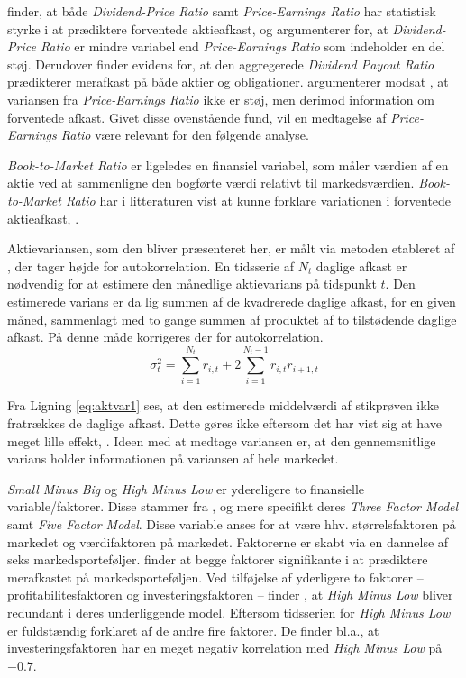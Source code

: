 \documentclass[
  a4paper,
  oneside]{memoir}
\begin{document}
\citep{Fama1988} finder, at både \emph{Dividend-Price Ratio} samt \emph{Price-Earnings Ratio} har statistisk styrke i at prædiktere forventede aktieafkast, og argumenterer for, at \emph{Dividend-Price Ratio} er mindre variabel end \emph{Price-Earnings Ratio} som indeholder en del støj. Derudover finder \citep{Lamont1998} evidens for, at den aggregerede \emph{Dividend Payout Ratio} prædikterer merafkast på både aktier og obligationer. \citep{Lamont1998} argumenterer modsat \citep{Fama1988}, at variansen fra \emph{Price-Earnings Ratio} ikke er støj, men derimod information om forventede afkast. Givet disse ovenstående fund, vil en medtagelse af \emph{Price-Earnings Ratio} være relevant for den følgende analyse.

\emph{Book-to-Market Ratio} er ligeledes en finansiel variabel, som måler værdien af en aktie ved at sammenligne den bogførte værdi relativt til markedsværdien. \emph{Book-to-Market Ratio} har i litteraturen vist at kunne forklare variationen i forventede aktieafkast, \citep{Kothari1997}.

Aktievariansen, som den bliver præsenteret her, er målt via metoden etableret af \citep{Schwert1987}, der tager højde for autokorrelation. En tidsserie af \(N_t\) daglige afkast er nødvendig for at estimere den månedlige aktievarians på tidspunkt \(t\). Den estimerede varians er da lig summen af de kvadrerede daglige afkast, for en given måned, sammenlagt med to gange summen af produktet af to tilstødende daglige afkast. På denne måde korrigeres der for autokorrelation.
\begin{equation}
\sigma^2_t = \sum_{i=1}^{N_t} r_{i,t} + 2 \sum_{i=1}^{N_t-1} r_{i,t}r_{i+1,t} \label{eq:aktvar1}
\end{equation}

Fra Ligning \eqref{eq:aktvar1} ses, at den estimerede middelværdi af stikprøven ikke fratrækkes de daglige afkast. Dette gøres ikke eftersom det har vist sig at have meget lille effekt, \citep{Schwert1987}. Ideen med at medtage variansen er, at den gennemsnitlige varians holder informationen på variansen af hele markedet.

\emph{Small Minus Big} og \emph{High Minus Low} er ydereligere to finansielle variable/faktorer. Disse stammer fra \citep{French1993, Fama2015}, og mere specifikt deres \emph{Three Factor Model} samt \emph{Five Factor Model}. Disse variable anses for at være hhv. størrelsfaktoren på markedet og værdifaktoren på markedet. Faktorerne er skabt via en dannelse af seks markedsporteføljer. \citep{French1993} finder at begge faktorer signifikante i at prædiktere merafkastet på markedsporteføljen. Ved tilføjelse af yderligere to faktorer -- profitabilitesfaktoren og investeringsfaktoren -- finder \citep{Fama2015}, at \emph{High Minus Low} bliver redundant i deres underliggende model. Eftersom tidsserien for \emph{High Minus Low} er fuldstændig forklaret af de andre fire faktorer. De finder bl.a., at investeringsfaktoren har en meget negativ korrelation med \emph{High Minus Low} på \(-0.7\).
\end{document}
